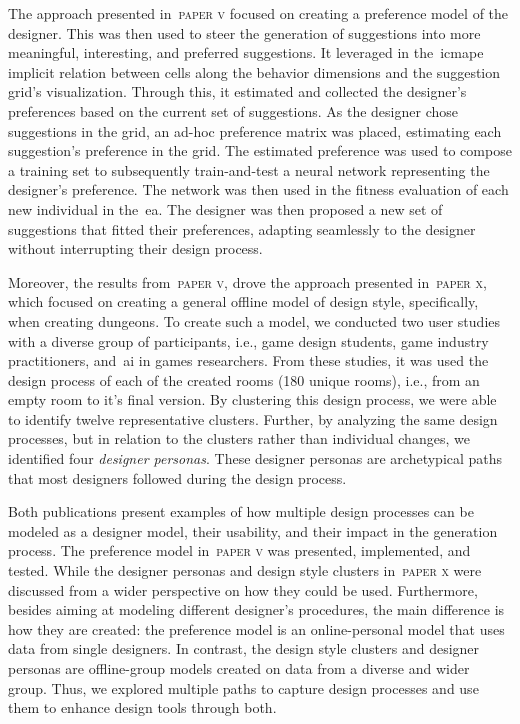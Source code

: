 The approach presented in~\textsc{paper v} focused on creating a preference model of the designer. This was then used to steer the generation of suggestions into more meaningful, interesting, and preferred suggestions. It leveraged in the~\acrshort{icmape} implicit relation between cells along the behavior dimensions and the suggestion grid's visualization. Through this, it estimated and collected the designer's preferences based on the current set of suggestions. As the designer chose suggestions in the grid, an ad-hoc preference matrix was placed, estimating each suggestion's preference in the grid. The estimated preference was used to compose a training set to subsequently train-and-test a neural network representing the designer's preference. The network was then used in the fitness evaluation of each new individual in the~\acrshort{ea}. The designer was then proposed a new set of suggestions that fitted their preferences, adapting seamlessly to the designer without interrupting their design process.

Moreover, the results from~\textsc{paper v}, drove the approach presented in~\textsc{paper x}, which focused on creating a general offline model of design style, specifically, when creating dungeons. To create such a model, we conducted two user studies with a diverse group of participants, i.e., game design students, game industry practitioners, and~\acrshort{ai} in games researchers. From these studies, it was used the design process of each of the created rooms (180 unique rooms), i.e., from an empty room to it's final version. By clustering this design process, we were able to identify twelve representative clusters. Further, by analyzing the same design processes, but in relation to the clusters rather than individual changes, we identified four \emph{designer personas}. These designer personas are archetypical paths that most designers followed during the design process.


Both publications present examples of how multiple design processes can be modeled as a designer model, their usability, and their impact in the generation process. The preference model in~\textsc{paper v} was presented, implemented, and tested. While the designer personas and design style clusters in~\textsc{paper x} were discussed from a wider perspective on how they could be used. Furthermore, besides aiming at modeling different designer's procedures, the main difference is how they are created: the preference model is an online-personal model that uses data from single designers. In contrast, the design style clusters and designer personas are offline-group models created on data from a diverse and wider group. Thus, we explored multiple paths to capture design processes and use them to enhance design tools through both.


